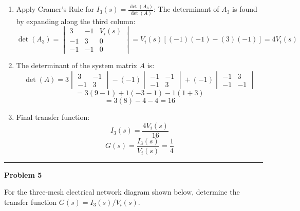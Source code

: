 \documentclass[11pt]{article}
\begin{document}
\begin{enumerate}[label=(\alph*), itemindent=*, leftmargin=*, nolistsep]
    \item Apply Cramer's Rule for $I_3(s) = \frac{\det(A_3)}{\det(A)}$:
    The determinant of \( A_3 \) is found by expanding along the third column:
    \[
    \det(A_3) = \begin{vmatrix}
    3 & -1 & V_i(s) \\
    -1 & 3 & 0 \\
    -1 & -1 & 0
    \end{vmatrix}
    = V_i(s) [(-1)(-1) - (3)(-1)] = 4V_i(s)
    \]

    \item The determinant of the system matrix \( A \) is:
    \[
    \det(A) = 3 \begin{vmatrix} 3 & -1 \\ -1 & 3 \end{vmatrix} - (-1) \begin{vmatrix} -1 & -1 \\ -1 & 3 \end{vmatrix} + (-1) \begin{vmatrix} -1 & 3 \\ -1 & -1 \end{vmatrix}
    \]
    \[
    = 3(9 - 1) + 1(-3 - 1) - 1(1 + 3)
    \]
    \[
    = 3(8) - 4 - 4 = 16
    \]

    \item Final transfer function:
    \[
    I_3(s) = \frac{4V_i(s)}{16}
    \]
    \[
    \boxed{
    G(s) = \frac{I_3(s)}{V_i(s)} = \frac{1}{4}
    }
    \]
\end{enumerate}
\newpage
  \setcounter{page}{7}
\noindent\rule{\textwidth}{1pt}
\noindent\textbf{Problem 5} \hfill 

\noindent For the three-mesh electrical network diagram shown below, determine the transfer function $G(s) = I_3(s)/V_i(s)$.
\end{document}
